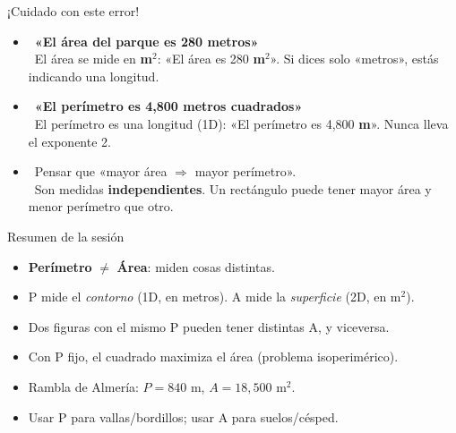 \documentclass[aspectratio=169, 10pt, spanish]{beamer}
\begin{document}
\begin{frame}{¡Cuidado con este error!}
  \begin{errorbox}
    \begin{itemize}
      \item \incorrecto\
            \textbf{«El área del parque es 280 metros»}
            \\[6pt]
            \correcto\
            El área se mide en \textbf{m$^2$}:
            «El área es 280 \textbf{m$^2$}».
            Si dices solo «metros», estás indicando una longitud.

      \vspace{0.3cm}
      \item \incorrecto\
            \textbf{«El perímetro es 4{,}800 metros cuadrados»}
            \\[6pt]
            \correcto\
            El perímetro es una longitud (1D):
            «El perímetro es 4{,}800 \textbf{m}».
            Nunca lleva el exponente 2.

      \vspace{0.3cm}
      \item \incorrecto\
            Pensar que «mayor área $\Rightarrow$ mayor perímetro».
            \\[6pt]
            \correcto\
            Son medidas \textbf{independientes}.
            Un rectángulo puede tener mayor área
            y menor perímetro que otro.
    \end{itemize}
  \end{errorbox}
\end{frame}

\begin{frame}{Resumen de la sesión}
  \begin{resumenbox}
    \begin{itemize}
      \item \textbf{Perímetro} $\neq$ \textbf{Área}: miden cosas distintas.
      \item P mide el \emph{contorno} (1D, en metros).
            A mide la \emph{superficie} (2D, en m$^2$).
      \item Dos figuras con el mismo P pueden tener distintas A,
            y viceversa.
      \item Con P fijo, el cuadrado maximiza el área
            (problema isoperimérico).
      \item Rambla de Almería: $P = 840$ m, $A = 18{,}500$ m$^2$.
      \item Usar P para vallas/bordillos;
            usar A para suelos/césped.
    \end{itemize}
  \end{resumenbox}
\end{frame}
\end{document}
